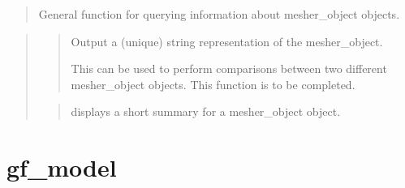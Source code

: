 \documentclass[a4paper,11pt,english]{sphinxmanual}
\begin{document}
\begin{sphinxVerbatim}[commandchars=\\\{\}]
    
  
\end{sphinxVerbatim}

\sphinxAtStartPar
{}
\begin{quote}

\sphinxAtStartPar
General function for querying information about mesher\_object objects.
\end{quote}

\sphinxAtStartPar
{}
\begin{quote}

\sphinxAtStartPar
{}
\begin{quote}

\sphinxAtStartPar
Output a (unique) string representation of the mesher\_object.

\sphinxAtStartPar
This can be used to perform comparisons between two
different mesher\_object objects.
This function is to be completed.
\end{quote}

\sphinxAtStartPar
{}
\begin{quote}

\sphinxAtStartPar
displays a short summary for a mesher\_object object.
\end{quote}
\end{quote}


\section{gf\_model}
\label{\detokenize{scilab/cmdref_gf_model:gf-model}}\label{\detokenize{scilab/cmdref_gf_model::doc}}
\sphinxAtStartPar
{}

\begin{sphinxVerbatim}[commandchars=\\\{\}]
  
  
\end{sphinxVerbatim}
\end{document}
